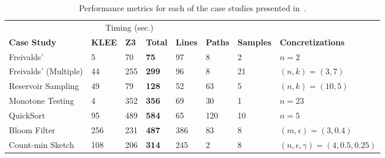 \documentclass[acmsmall,review,anonymous]{acmart}\settopmatter{printfolios=true,printccs=false,printacmref=false}
\begin{document}
\begin{table}
  \centering
  \caption{Performance metrics for each of the case studies presented in~.}
  \label{tab:q1}
  \begin{tabular}{@{}llllllll@{}}
    \toprule
    & \multicolumn{3}{c}{Timing (sec.)} &&\\ \cmidrule{2-4}
    \textbf{Case Study} & \textbf{KLEE} & \textbf{Z3} & \textbf{Total} & \textbf{Lines} & \textbf{Paths} & \textbf{Samples} & \textbf{Concretizations}\\ \midrule
    Freivalds' & 5 & 70 & \textbf{75} & 97 & 8 & 2 & $n=2$ \\
    Freivalds' (Multiple) & 44 & 255 & \textbf{299} & 96 & 8 & 21 & $(n, k) = (3, 7)$ \\
    Reservoir Sampling & 49 & 79 & \textbf{128} & 52 & 63 & 5 & $(n, k) = (10, 5)$ \\
    Monotone Testing & 4 & 352 & \textbf{356} & 69 & 30 & 1 & $n=23$ \\
    QuickSort & 95 & 489 & \textbf{584} & 65 & 120 & 10 & $n=5$ \\
    Bloom Filter & 256 & 231 & \textbf{487} & 386 & 83 & 8 & $(m, \epsilon) = (3, 0.4)$ \\
    Count-min Sketch & 108 & 206 & \textbf{314} & 245 & 2 & 8 & $(n, \epsilon, \gamma) = (4, 0.5, 0.25)$ \\

    \bottomrule
  \end{tabular}
\end{table}
\end{document}

